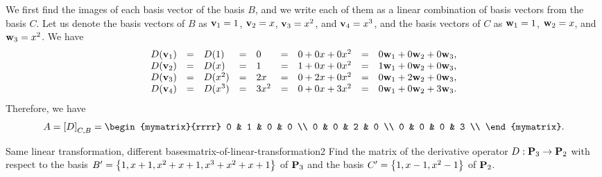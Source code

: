 \begin{solution}
  We first find the images of each basis vector of the basis $B$, and
  we write each of them as a linear combination of basis vectors from
  the basis $C$. Let us denote the basis vectors of $B$ as
  $\mbox{\bf v}_1 = 1$, $\mbox{\bf v}_2 = x$, $\mbox{\bf v}_3 = x^2$, and
  $\mbox{\bf v}_4=x^3$, and the basis vectors of $C$ as $\mbox{\bf w}_1 = 1$,
  $\mbox{\bf w}_2 = x$, and $\mbox{\bf w}_3 = x^2$. We have
  \begin{equation*}
    \begin{array}{rclclclcl}
      D(\mbox{\bf v}_1) &=& D(1) &=& 0 &=& 0 + 0x + 0x^2 &=& 0\mbox{\bf w}_1 + 0\mbox{\bf w}_2 + 0\mbox{\bf w}_3, \\
      D(\mbox{\bf v}_2) &=& D(x) &=& 1 &=& 1 + 0x + 0x^2 &=& 1\mbox{\bf w}_1 + 0\mbox{\bf w}_2 + 0\mbox{\bf w}_3, \\
      D(\mbox{\bf v}_3) &=& D(x^2) &=& 2x &=& 0 + 2x + 0x^2 &=& 0\mbox{\bf w}_1 + 2\mbox{\bf w}_2 + 0\mbox{\bf w}_3, \\
      D(\mbox{\bf v}_4) &=& D(x^3) &=& 3x^2 &=& 0 + 0x + 3x^2 &=& 0\mbox{\bf w}_1 + 0\mbox{\bf w}_2 + 3\mbox{\bf w}_3. \\
    \end{array}
  \end{equation*}
  Therefore, we have
  \begin{equation*}
    A=\coord{D}_{C,B} =
    \begin{mymatrix}{rrrr}
      0 & 1 & 0 & 0 \\
      0 & 0 & 2 & 0 \\
      0 & 0 & 0 & 3 \\
    \end{mymatrix}.
  \end{equation*}
\end{solution}

\begin{example}{Same linear transformation, different bases}{matrix-of-linear-transformation2}
  Find the matrix of the derivative operator $D:\mathbf{P}_3\to\mathbf{P}_2$
  with respect to the basis $B'=\left\{1,x+1,x^2+x+1,x^3+x^2+x+1\right\}$ of
  $\mathbf{P}_3$ and the basis $C'=\left\{1,x-1,x^2-1\right\}$ of $\mathbf{P}_2$.
\end{example}

